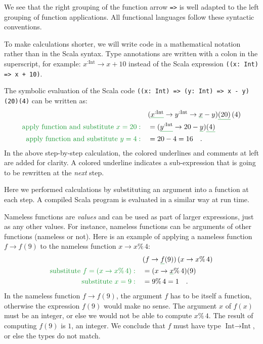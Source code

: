 We see that the right grouping of the function arrow \lstinline!=>!
is well adapted to the left grouping of function applications. All
functional languages follow these syntactic conventions.

To make calculations shorter, we will write code in a mathematical
notation rather than in the Scala syntax. Type annotations are written
with a colon in the superscript, for example: $x^{:\text{Int}}\rightarrow x+10$
instead of the Scala expression \lstinline!((x: Int) => x + 10)!.

The symbolic evaluation of the Scala code \lstinline!((x: Int) => (y: Int) => x - y)(20)(4)!
can be written as:
\begin{align*}
 & (\gunderline{x^{:\text{Int}}}\rightarrow y^{:\text{Int}}\rightarrow\gunderline x-y)\gunderline{\left(20\right)}\left(4\right)\\
{\color{greenunder}\text{apply function and substitute }x=20:}\quad & =(\gunderline{y^{:\text{Int}}}\rightarrow20-\gunderline y)\gunderline{\left(4\right)}\\
{\color{greenunder}\text{apply function and substitute }y=4:}\quad & =20-4=16\quad.
\end{align*}
In the above step-by-step calculation, the colored underlines and
comments at left are added for clarity. A colored underline indicates
a sub-expression that is going to be rewritten at the \emph{next}
step.

Here we performed calculations by substituting an argument into a
function at each step. A compiled Scala program is evaluated in a
similar way at run time.

Nameless functions are \emph{values} and can be used as part of larger
expressions, just as any other values. For instance, nameless functions
can be arguments of other functions (nameless or not). Here is an
example of applying a nameless function $f\rightarrow f(9)$ to the
nameless function $x\rightarrow x\%\,4$:
\begin{align*}
 & (f\rightarrow\gunderline f(9))\left(x\rightarrow x\%\,4\right)\\
{\color{greenunder}\text{substitute }f=\left(x\rightarrow x\%\,4\right):}\quad & =(x\rightarrow\gunderline x\%\,4)(9)\\
{\color{greenunder}\text{substitute }x=9:}\quad & =9\%\,4=1\quad.
\end{align*}
In the nameless function $f\rightarrow f(9)$, the argument $f$ has
to be itself a function, otherwise the expression $f(9)$ would make
no sense. The argument $x$ of $f(x)$ must be an integer, or else
we would not be able to compute $x\%\,4$. The result of computing
$f(9)$ is $1$, an integer. We conclude that $f$ must have type
$\text{Int}\rightarrow\text{Int}$, or else the types do not match.

